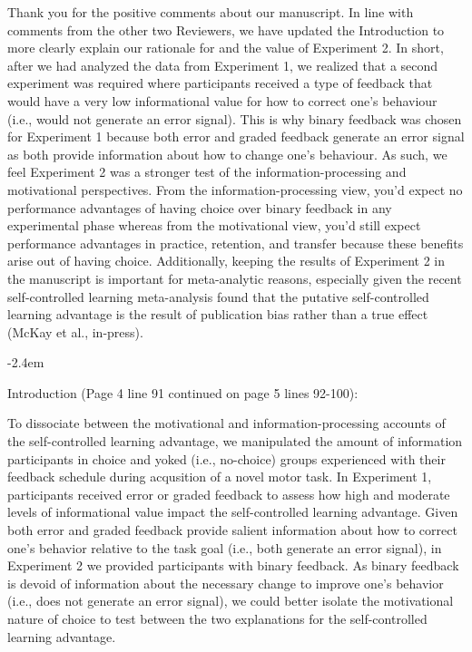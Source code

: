 \documentclass[final]{article}
\renewenvironment{quote}{\begin{fquote}\advance\leftmargini -2.4em\begin{oldquote}}{\end{oldquote}\end{fquote}}
\newenvironment{fquote}
  {\def\FrameCommand{
	\fboxsep=0.6em %
	\fcolorbox{black}{white}}%
    \MakeFramed {\advance\hsize-2\width \FrameRestore}
    \begin{minipage}{\linewidth}
  }
  {\end{minipage}\endMakeFramed}
\begin{document}
Thank you for the positive comments about our manuscript. In line with comments from the other two Reviewers, we have updated the Introduction to more clearly explain our rationale for and the value of Experiment 2. In short, after we had analyzed the data from Experiment 1, we realized that a second experiment was required where participants received a type of feedback that would have a very low informational value for how to correct one's behaviour (i.e., would not generate an error signal). This is why binary feedback was chosen for Experiment 1 because both error and graded feedback generate an error signal as both provide information about how to change one's behaviour. As such, we feel Experiment 2 was a stronger test of the information-processing and motivational perspectives. From the information-processing view, you'd expect no performance advantages of having choice over binary feedback in any experimental phase whereas from the motivational view, you'd still expect performance advantages in practice, retention, and transfer because these benefits arise out of having choice. Additionally, keeping the results of Experiment 2 in the manuscript is important for meta-analytic reasons, especially given the recent self-controlled learning meta-analysis found that the putative self-controlled learning advantage is the result of publication bias rather than a true effect (McKay et al., in-press).

\begin{quote}
Introduction (Page 4 line 91 continued on page 5 lines 92-100):

To dissociate between the motivational and information-processing accounts of the self-controlled learning advantage, we manipulated the amount of information participants in choice and yoked (i.e., no-choice) groups experienced with their feedback schedule during acqusition of a novel motor task. In Experiment 1, participants received error or graded feedback to assess how high and moderate levels of informational value impact the self-controlled learning advantage. Given both error and graded feedback provide salient information about how to correct one's behavior relative to the task goal (i.e., both generate an error signal), in Experiment 2 we provided participants with binary feedback. As binary feedback is devoid of information about the necessary change to improve one's behavior (i.e., does not generate an error signal), we could better isolate the motivational nature of choice to test between the two explanations for the self-controlled learning advantage.
\end{quote}
\end{document}
